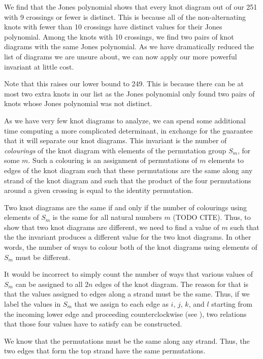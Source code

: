 \begin{paper}

We find that the Jones polynomial shows that every knot diagram out of our 251
with 9 crossings or fewer is distinct.
This is because all of the non-alternating knots with fewer than 10 crossings
have distinct values for their Jones polynomial.
Among the knots with 10 crossings, we find two pairs of knot diagrams with the
same Jones polynomial.
As we have dramatically reduced the list of diagrams we are unsure about, we can
now apply our more powerful invariant at little cost.

Note that this raises our lower bound to 249.
This is because there can be at most two extra knots in our list as the Jones
polynomial only found two pairs of knots whose Jones polynomial was not
distinct.


As we have very few knot diagrams to analyze, we can spend some additional time
computing a more complicated determinant, in exchange for the guarantee that it
will separate our knot diagrams.
This invariant is the number of \textit{colourings} of the knot diagram with
elements of the permutation group $S_m$, for some $m$.
Such a colouring is an assignment of permutations of $m$ elements to edges of
the knot diagram such that these permutations are the same along any strand of
the knot diagram and such that the product of the four permutations around a
given crossing is equal to the identity permutation.

Two knot diagrams are the same if and only if the number of colourings using
elements of $S_m$ is the same for all natural numbers $m$ (TODO CITE).
Thus, to show that two knot diagrams are different, we need to find a value of
$m$ such that the the invariant produces a different value for the two knot
diagrams.
In other words, the number of ways to colour both of the knot diagrams using
elements of $S_m$ must be different.

It would be incorrect to simply count the number of ways that various values of
$S_m$ can be assigned to all $2n$ edges of the knot diagram.
The reason for that is that the values assigned to edges along a strand must be
the same.
Thus, if we label the values in $S_m$ that we assign to each edge as $i$, $j$,
$k$, and $l$ starting from the incoming lower edge and proceeding
counterclockwise (see \figX), two relations that those four values have to
satisfy can be constructed.

We know that the permutations must be the same along any strand.
Thus, the two edges that form the top strand have the same permutations.


\end{paper}
